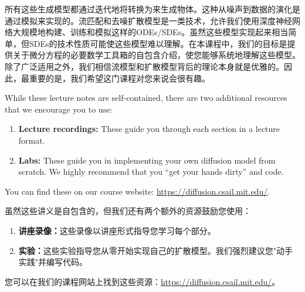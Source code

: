所有这些生成模型都通过迭代地将转换为来生成物体。这种从噪声到数据的演化是通过模拟来实现的。流匹配和去噪扩散模型是一类技术，允许我们使用深度神经网络大规模地构建、训练和模拟这样的ODEs/SDEs。虽然这些模型实现起来相当简单，但SDEs的技术性质可能使这些模型难以理解。在本课程中，我们的目标是提供关于微分方程的必要数学工具箱的自包含介绍，使您能够系统地理解这些模型。除了广泛适用之外，我们相信流模型和扩散模型背后的理论本身就是优雅的。因此，最重要的是，我们希望这门课程对您来说会很有趣。 

\begin{remarkbox} 
While these lecture notes are self-contained, there are two additional resources that we encourage you to use:
\begin{enumerate}
    \item \textbf{Lecture recordings:} These guide you through each section in a lecture format.
    \item \textbf{Labs:} These guide you in implementing your own diffusion model from scratch. We highly recommend that you ``get your hands dirty'' and code.
\end{enumerate}
You can find these on our course website: \url{https://diffusion.csail.mit.edu/}.
\end{remarkbox}

\begin{remarkbox}[附加资源] 
虽然这些讲义是自包含的，但我们还有两个额外的资源鼓励您使用：
\begin{enumerate}
    \item \textbf{讲座录像：}这些录像以讲座形式指导您学习每个部分。
    \item \textbf{实验：}这些实验指导您从零开始实现自己的扩散模型。我们强烈建议您"动手实践"并编写代码。
\end{enumerate}
您可以在我们的课程网站上找到这些资源：\url{https://diffusion.csail.mit.edu/}。
\end{remarkbox}



